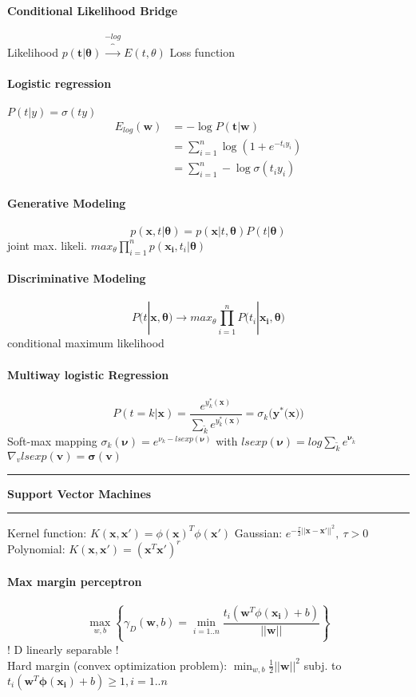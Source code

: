 \documentclass[7pt]{scrartcl}
\newlength{\secskip}
\renewcommand{\section}[1]{
  \vspace{\secskip}
  \hrule\vspace{.3em}
  \textbf{#1}
  \vspace{.3em}
  \hrule
  \vspace{\secskip}
}
\renewcommand{\vec}{\mathbf}
\begin{document}
\begin{multicols}{4}
\paragraph{Conditional Likelihood Bridge}
Likelihood $p(\vec t|\vec \theta) \overbrace{\longrightarrow}^ {-log} E(t,\theta)$ Loss function
\paragraph{Logistic regression} $P(t|y) = \sigma(ty)$
\begin{align*}
 E_{log}(\vec w) &= - \log P(\vec t | \vec w)\\
 &= \sum\nolimits_{i=1}^n \log \left (1 + e^{-t_iy_i} \right)\\
 &= \sum\nolimits_{i=1}^n -\log \sigma (t_iy_i)
\end{align*}
\paragraph{Generative Modeling}
\[p(\vec{x},t|\vec{\theta}) = p(\vec{x}|t,\vec{\theta})P(t|\vec{\theta})\]
joint max. likeli. $max_{\theta} \prod_{i=1}^n p(\vec{x_i},t_i|\vec{\theta})$ 

\paragraph{Discriminative Modeling}
\[P(t|\vec{x,\theta}) \rightarrow max_\theta \prod_{i=1}^n P(t_i|\vec{x_i,\theta)}\]
conditional maximum likelihood
\paragraph{Multiway logistic Regression}
\[P(t=k|\vec{x}) = \frac{e^{y_k^*(\vec{x})}}{\sum_{\tilde{k}}e^{y_{\tilde{k}}^*(\vec{x})}} = \sigma_k(\vec{y}^*(\vec{x))}\]
Soft-max mapping $\sigma_k(\vec{\nu}) = e^{\nu_k - lsexp(\vec{\nu})}$ with $lsexp(\vec{\nu}) = log \sum_{\tilde{k}}e^{\vec{\nu}_{\tilde{k}}}$
$\nabla_v lsexp(\vec v) = \vec \sigma(\vec v)$

\section{Support Vector Machines}
Kernel function: $K(\vec x, \vec x') = \phi(\vec x)^T\phi(\vec x')$
Gaussian: $e^{-\frac{\tau}{2}||\vec{x}-\vec{x'}||^2}, ~ \tau >0$\\
Polynomial: $K(\vec x,\vec x') = (\vec x^T\vec x')^r$
\paragraph{Max margin perceptron}
\[\max_{w,b} \left\{ \gamma_D(\vec{w},b) = \min_{i=1..n} \frac{t_i(\vec{w}^T \phi(\vec{x_i}) + b)}{||\vec{w}||} \right\}\]
! D linearly separable ! \\
Hard margin (convex optimization problem): $\min_{w,b} \frac{1}{2}||\vec w||^2$ subj. to $t_i(\vec w^T \vec{\phi(x_i)} + b) \geq 1, i=1..n$

\end{multicols}
\end{document}
